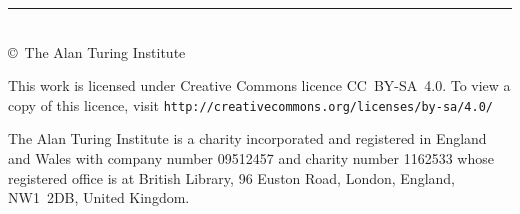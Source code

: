 \documentclass[a4paper]{article}
\begin{document}
\begin{titlepage}
\raggedright\setlength{\parindent}{0pt}%
\vspace*{5\turingcolht}

\begin{minipage}{9\turingcolwd}
\small\raggedright
{\offinterlineskip\rule{9\turingcolwd}{0.15ex}\\[0.5ex]
\copyright\ The Alan Turing Institute \reportCopyrightDate\par}
\medskip 

This work is licensed under Creative Commons licence
CC~BY-SA~4.0. To view a copy of this licence, visit
\fontsize{7.5}{11}\selectfont
\texttt{http://creativecommons.org/licenses/by-sa/4.0/}
\medskip

The Alan Turing Institute is a charity incorporated and registered in
England and Wales with company number 09512457 and charity number
1162533 whose registered office is at British Library, 96 Euston Road,
London, England, NW1~2DB, United Kingdom.
\end{minipage}
\end{titlepage}
\end{document}
